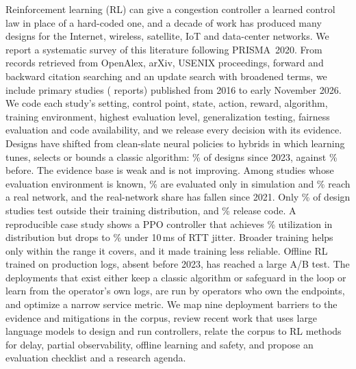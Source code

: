 Reinforcement learning (RL) can give a congestion controller a learned control law in place of a hard-coded one, and a decade of work has produced many designs for the Internet, wireless, satellite, IoT and data-center networks. We report a systematic survey of this literature following PRISMA~2020. From \nIdentifiedTotal{} records retrieved from OpenAlex, arXiv, USENIX proceedings, forward and backward citation searching and an update search with broadened terms, we include \nStudies{} primary studies (\nReportsIncluded{} reports) published from 2016 to early November 2026. We code each study's setting, control point, state, action, reward, algorithm, training environment, highest evaluation level, generalization testing, fairness evaluation and code availability, and we release every decision with its evidence.
Designs have shifted from clean-slate neural policies to hybrids in which learning tunes, selects or bounds a classic algorithm: \nPctHybridPost\% of designs since 2023, against \nPctHybridPre\% before. The evidence base is weak and is not improving. Among studies whose evaluation environment is known, \nPctSimOnlyOfKnown\% are evaluated only in simulation and \nPctRealOfKnown\% reach a real network, and the real-network share has fallen since 2021. Only \nPctGen\% of design studies test outside their training distribution, and \nPctCodeDesign\% release code. A reproducible case study shows a PPO controller that achieves \nCsNarrowRefUtil\% utilization in distribution but drops to \nCsNarrowJitterTenUtil\% under 10\,ms of RTT jitter. Broader training helps only within the range it covers, and it made training less reliable. Offline RL trained on production logs, absent before 2023, has reached a large A/B test. The deployments that exist either keep a classic algorithm or safeguard in the loop or learn from the operator's own logs, are run by operators who own the endpoints, and optimize a narrow service metric. We map nine deployment barriers to the evidence and mitigations in the corpus, review recent work that uses large language models to design and run controllers, relate the corpus to RL methods for delay, partial observability, offline learning and safety, and propose an evaluation checklist and a research agenda.
